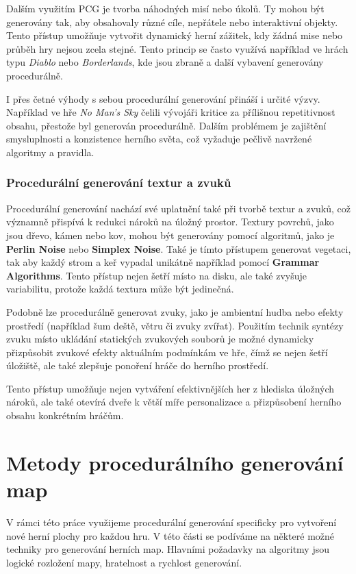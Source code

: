 Dalším využitím PCG je tvorba náhodných misí nebo úkolů. Ty mohou být generovány tak, aby obsahovaly různé cíle, nepřátele nebo interaktivní objekty. Tento přístup umožňuje vytvořit dynamický herní zážitek, kdy žádná mise nebo průběh hry nejsou zcela stejné. Tento princip se často využívá například ve hrách typu \emph{Diablo} nebo \emph{Borderlands}, kde jsou zbraně a další vybavení generovány procedurálně.

I přes četné výhody s sebou procedurální generování přináší i určité výzvy. Například ve hře \textit{No Man's Sky} čelili vývojáři kritice za přílišnou repetitivnost obsahu, přestože byl generován procedurálně. Dalším problémem je zajištění smysluplnosti a konzistence herního světa, což vyžaduje pečlivě navržené algoritmy a pravidla.

\subsubsection{Procedurální generování textur a zvuků}
Procedurální generování nachází své uplatnění také při tvorbě textur a zvuků, což významně přispívá k redukci nároků na úložný prostor. Textury povrchů, jako jsou dřevo, kámen nebo kov, mohou být generovány pomocí algoritmů, jako je \textbf{Perlin Noise} nebo \textbf{Simplex Noise}. Také je tímto přístupem generovat vegetaci, tak aby každý strom a keř vypadal unikátně například pomocí \textbf{Grammar Algorithms}. Tento přístup nejen šetří místo na disku, ale také zvyšuje variabilitu, protože každá textura může být jedinečná.

Podobně lze procedurálně generovat zvuky, jako je ambientní hudba nebo efekty prostředí (například šum deště, větru či zvuky zvířat). Použitím technik syntézy zvuku místo ukládání statických zvukových souborů je možné dynamicky přizpůsobit zvukové efekty aktuálním podmínkám ve hře, čímž se nejen šetří úložiště, ale také zlepšuje ponoření hráče do herního prostředí.

Tento přístup umožňuje nejen vytváření efektivnějších her z hlediska úložných nároků, ale také otevírá dveře k větší míře personalizace a přizpůsobení herního obsahu konkrétním hráčům.




\section{Metody procedurálního generování map}

V rámci této práce využijeme procedurální generování specificky pro vytvoření nové herní plochy pro každou hru. V této části se podíváme na některé možné techniky pro generování herních map. Hlavními požadavky na algoritmy jsou logické rozložení mapy, hratelnost a rychlost generování.

